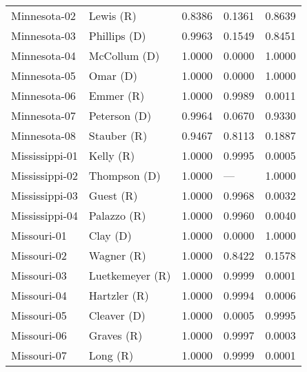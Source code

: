 \begin{longtable}{llrll}
      Minnesota-02 &            {\color{Red} Lewis (R)} &       0.8386 &        0.1361 &        0.8639 \\
      Minnesota-03 &        {\color{Blue} Phillips (D)} &       0.9963 &        0.1549 &        0.8451 \\
      Minnesota-04 &        {\color{Blue} McCollum (D)} &       1.0000 &        0.0000 &        1.0000 \\
      Minnesota-05 &            {\color{Blue} Omar (D)} &       1.0000 &        0.0000 &        1.0000 \\
      Minnesota-06 &            {\color{Red} Emmer (R)} &       1.0000 &        0.9989 &        0.0011 \\
      Minnesota-07 &        {\color{Blue} Peterson (D)} &       0.9964 &        0.0670 &        0.9330 \\
      Minnesota-08 &          {\color{Red} Stauber (R)} &       0.9467 &        0.8113 &        0.1887 \\
    Mississippi-01 &            {\color{Red} Kelly (R)} &       1.0000 &        0.9995 &        0.0005 \\
    Mississippi-02 &        {\color{Blue} Thompson (D)} &       1.0000 &           --- &        1.0000 \\
    Mississippi-03 &            {\color{Red} Guest (R)} &       1.0000 &        0.9968 &        0.0032 \\
    Mississippi-04 &          {\color{Red} Palazzo (R)} &       1.0000 &        0.9960 &        0.0040 \\
       Missouri-01 &            {\color{Blue} Clay (D)} &       1.0000 &        0.0000 &        1.0000 \\
       Missouri-02 &           {\color{Red} Wagner (R)} &       1.0000 &        0.8422 &        0.1578 \\
       Missouri-03 &      {\color{Red} Luetkemeyer (R)} &       1.0000 &        0.9999 &        0.0001 \\
       Missouri-04 &         {\color{Red} Hartzler (R)} &       1.0000 &        0.9994 &        0.0006 \\
       Missouri-05 &         {\color{Blue} Cleaver (D)} &       1.0000 &        0.0005 &        0.9995 \\
       Missouri-06 &           {\color{Red} Graves (R)} &       1.0000 &        0.9997 &        0.0003 \\
       Missouri-07 &             {\color{Red} Long (R)} &       1.0000 &        0.9999 &        0.0001 \\

\end{longtable}
